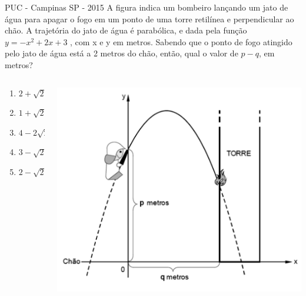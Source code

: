 \documentclass[11pt]{beamer}
\newif\ifgab
\newcommand{\gab}[1]{%
  \ifgab
    \textcolor{red!80!black}{\textbf{#1}}%
  \else
    #1%
  \fi
}
\begin{document}
\begin{frame}{PUC - Campinas SP - 2015}
    A figura indica um bombeiro lançando um jato de água para apagar o fogo em um ponto de uma torre retilínea e perpendicular ao chão. A trajetória do jato de água é parabólica, e dada pela função $y = -x^{2} + 2x + 3$ , com x e y em metros. Sabendo que o ponto de fogo atingido pelo jato de água está a 2 metros do chão, então, qual o valor de $p-q$, em metros?

    \begin{columns}
        \begin{column}{0.4\textwidth}
            \begin{enumerate}[a]
                \item $2+\sqrt{2}$ 
                \item $1+\sqrt{2}$  
                \item $4-2\sqrt{2}$
                \item $3-\sqrt{2}$ 
                \item \gab{$2-\sqrt{2}$} %
            \end{enumerate}
        \end{column}

        \begin{column}{0.6\textwidth}
            \centering
            \includegraphics[width=0.75\linewidth]{imagens/q20.png}
        \end{column}
    \end{columns}
\end{frame}
\end{document}
